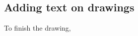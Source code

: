 \documentclass[a4paper,10pt,english]{article}
\begin{document}
\subsection{Adding text on drawings}
%
To finish the drawing, 

\begin{figure}
	\centering
	
\end{figure}











% 
% 
\end{document}
